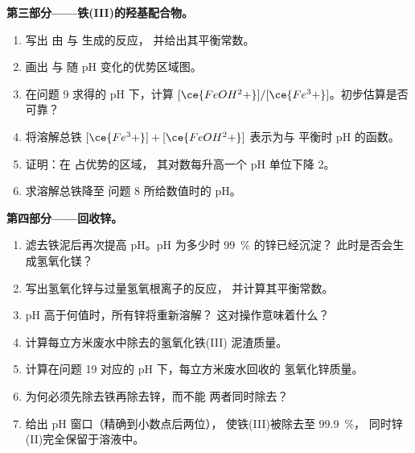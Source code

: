 \begin{problem}
\medskip
\noindent\textbf{第三部分——铁(III)的羟基配合物。}
\begin{enumerate}[resume]
  \item 写出  由  与  生成的反应，
        并给出其平衡常数。
  \item 画出  与  随 pH
        变化的优势区域图。
  \item 在问题 9 求得的 pH 下，计算
        $[\ce{FeOH^2+}]/[\ce{Fe^3+}]$。初步估算是否可靠？
  \item 将溶解总铁 $[\ce{Fe^3+}] + [\ce{FeOH^2+}]$
        表示为与  平衡时 pH 的函数。
  \item 证明：在  占优势的区域，
        其对数每升高一个 pH 单位下降 2。
  \item 求溶解总铁降至
        问题 8 所给数值时的 pH。
\end{enumerate}

\medskip
\noindent\textbf{第四部分——回收锌。}
\begin{enumerate}[resume]
  \item 滤去铁泥后再次提高 pH。pH 为多少时
        \qty{99}{\percent} 的锌已经沉淀？
        此时是否会生成氢氧化镁？
  \item 写出氢氧化锌与过量氢氧根离子的反应，
        并计算其平衡常数。
  \item pH 高于何值时，所有锌将重新溶解？
        这对操作意味着什么？
  \item 计算每立方米废水中除去的氢氧化铁(III)
        泥渣质量。
  \item 计算在问题 19 对应的 pH 下，每立方米废水回收的
        氢氧化锌质量。
  \item 为何必须先除去铁再除去锌，而不能
        两者同时除去？
  \item 给出 pH 窗口（精确到小数点后两位），
        使铁(III)被除去至 \qty{99.9}{\percent}，
        同时锌(II)完全保留于溶液中。
\end{enumerate}
\end{problem}
